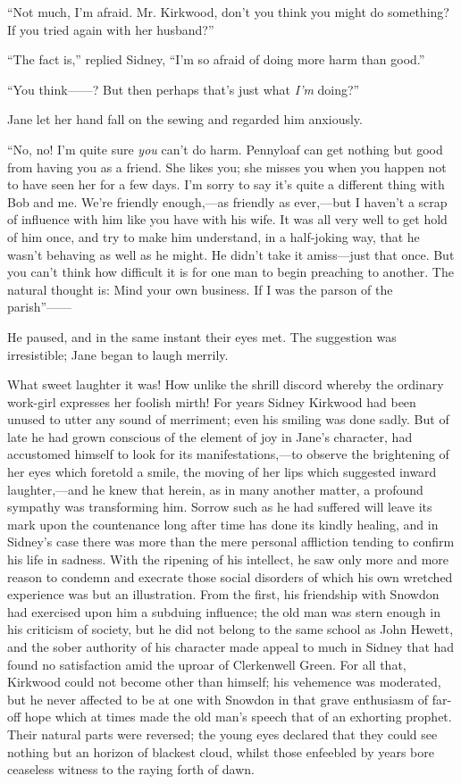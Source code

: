 ``Not much, I'm afraid. Mr. Kirkwood, don't you think you might do
something? If you tried again with her husband?''

``The fact is,'' replied Sidney, ``I'm so afraid of doing more harm than
good.''

``You think{{------}}? But then perhaps that's just what \emph{I'm}
doing?''

Jane let her hand fall on the sewing and regarded him anxiously.

``No, no! I'm quite sure \emph{you} can't do harm. Pennyloaf can get
nothing but good from having you as a friend. She likes you; she misses
you when you happen not to have {\protect\hypertarget{45}{}{}}seen her
for a few days. I'm sorry to say it's quite a different thing with Bob
and me. We're friendly enough,---as friendly as ever,---but I haven't a
scrap of influence with him like you have with his wife. It was all very
well to get hold of him once, and try to make him understand, in a
half-joking way, that he wasn't behaving as well as he might. He didn't
take it amiss---just that once. But you can't think how difficult it is
for one man to begin preaching to another. The natural thought is: Mind
your own business. If I was the parson of the parish''{{------}}

He paused, and in the same instant their eyes met. The suggestion was
irresistible; Jane began to laugh merrily.

What sweet laughter it was! How unlike the shrill discord whereby the
ordinary work-girl expresses her foolish mirth! For years Sidney
Kirkwood had been unused to utter any sound of merriment; even his
smiling was done sadly. But of late he had grown conscious of the
element of joy in Jane's character, had accustomed himself to look for
{\protect\hypertarget{46}{}{}}its manifestations,---to observe the
brightening of her eyes which foretold a smile, the moving of her lips
which suggested inward laughter,---and he knew that herein, as in many
another matter, a profound sympathy was transforming him. Sorrow such as
he had suffered will leave its mark upon the countenance long after time
has done its kindly healing, and in Sidney's case there was more than
the mere personal affliction tending to confirm his life in sadness.
With the ripening of his intellect, he saw only more and more reason to
condemn and execrate those social disorders of which his own wretched
experience was but an illustration. From the first, his friendship with
Snowdon had exercised upon him a subduing influence; the old man was
stern enough in his criticism of society, but he did not belong to the
same school as John Hewett, and the sober authority of his character
made appeal to much in Sidney that had found no satisfaction amid the
uproar of Clerkenwell Green. For all that, Kirkwood could not become
other than himself; his vehemence was
{\protect\hypertarget{47}{}{}}moderated, but he never affected to be at
one with Snowdon in that grave enthusiasm of far-off hope which at times
made the old man's speech that of an exhorting prophet. Their natural
parts were reversed; the young eyes declared that they could see nothing
but an horizon of blackest cloud, whilst those enfeebled by years bore
ceaseless witness to the raying forth of dawn.

